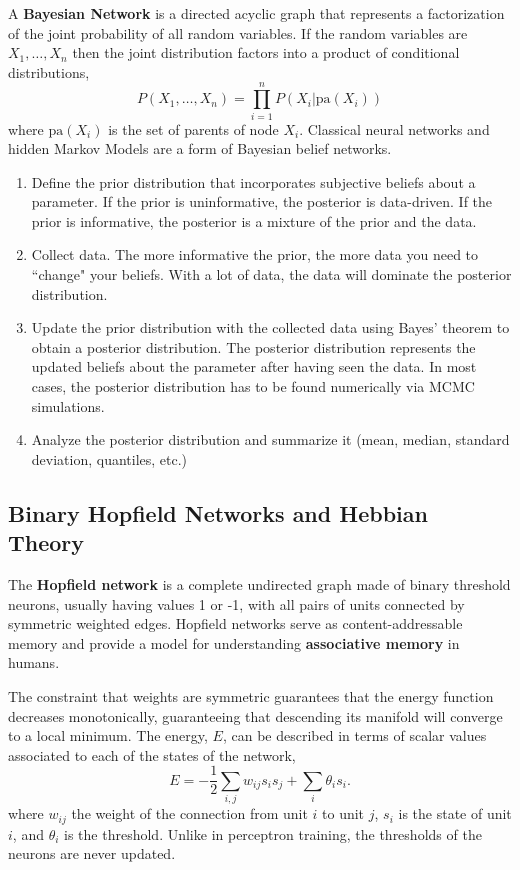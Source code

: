 \documentclass{article}
\begin{document}
A \textbf{Bayesian Network} is a directed acyclic graph that represents a factorization of the joint probability of all random variables.  If the random variables are $X_{1},\ldots ,X_{n}$ then the joint distribution factors into a product of conditional distributions, 
\[
    P(X_{1},\ldots ,X_{n}) = \prod_{i=1}^{n}P(X_{i}|{\text{pa}}(X_{i}))
\]
where ${\text{pa}}(X_{i})$ is the set of parents of node $X_{i}$. Classical neural networks and hidden Markov Models are a form of Bayesian belief networks.


\begin{enumerate}
    \item Define the prior distribution that incorporates subjective beliefs about a parameter. If the prior is uninformative, the posterior is data-driven. If the prior is informative, the posterior is a mixture of the prior and the data.
    
    \item Collect data. The more informative the prior, the more data you need to ``change" your beliefs. With a lot of data, the data will dominate the posterior distribution.
    
    \item Update the prior distribution with the collected data using Bayes' theorem to obtain a posterior distribution. The posterior distribution represents the updated beliefs about the parameter after having seen the data. In most cases, the posterior distribution has to be found numerically via MCMC simulations.
    
    \item Analyze the posterior distribution and summarize it (mean, median, standard deviation, quantiles, etc.)
\end{enumerate}

\subsection{Binary Hopfield Networks and Hebbian Theory}

The \textbf{Hopfield network} is a complete undirected graph made of binary threshold neurons, usually having values 1 or -1, with all pairs of units connected by symmetric weighted edges. Hopfield networks serve as content-addressable memory and provide a model for understanding \textbf{associative memory} in humans.

The constraint that weights are symmetric guarantees that the energy function decreases monotonically, guaranteeing that descending its manifold will converge to a local minimum. The energy, $E$, can be described in terms of scalar values associated to each of the states of the network,
\[
    E = -\frac{1}{2} \sum_{i,j} w_{ij} s_i s_j + \sum_i \theta_i s_i.
\]
where $w_{ij}$ the weight of the connection from unit $i$ to unit $j$, $s_{i}$ is the state of unit $i$, and $\theta_{i}$ is the threshold. Unlike in perceptron training, the thresholds of the neurons are never updated.
\end{document}
